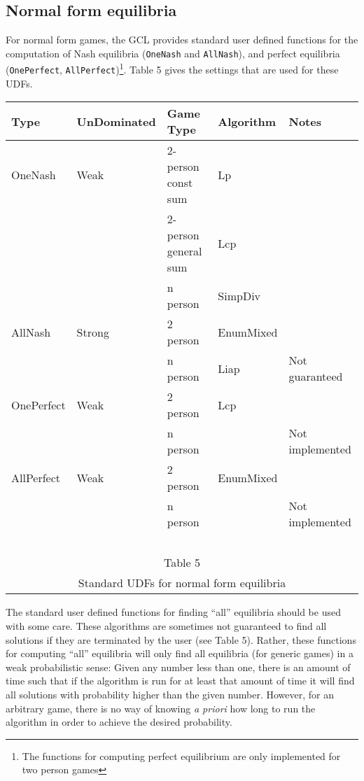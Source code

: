 \subsection{Normal form equilibria}

For normal form games, the GCL provides standard user defined
functions for the computation of Nash equilibria (\texttt{OneNash} and \texttt{AllNash}), and perfect
equilibria (\texttt{OnePerfect}, \texttt{AllPerfect})\footnote{The
functions for computing perfect equilibrium are only implemented for
two person games}.  Table 5 gives the settings that are used for these
UDFs.

\medskip
\begin{center}
\begin{tabular}{|l|l|p{2cm}|l|l|}
\hline
Type & UnDominated & Game Type & Algorithm & Notes \\
\hline
OneNash & Weak & 2-person const sum & Lp & \\ \cline{3-5}
        &      & 2-person general  sum & Lcp& \\ \cline{3-5}
        &      & n person              & SimpDiv & \\
\hline
AllNash & Strong & 2 person       & EnumMixed & \\ \cline{3-5}
        &        & n person       & Liap      & Not guaranteed\\
\hline
\hline
OnePerfect & Weak & 2 person     & Lcp    & \\ \cline{3-5}
           &        & n person     &     &Not implemented  \\
\hline
AllPerfect & Weak & 2 person      & EnumMixed & \\ \cline{3-5}
           &        & n person      &     & Not implemented\\
\hline
\multicolumn{5}{c}{\ }\\
\multicolumn{5}{c}{Table 5}\\
\multicolumn{5}{c}{Standard UDFs for normal form equilibria}\\
\end{tabular}
\end{center}
\medskip

The standard user defined functions for finding ``all'' equilibria
should be used with some care.  These algorithms are sometimes not
guaranteed to find all solutions if they are terminated by the user
(see Table 5).  Rather, these functions for computing ``all''
equilibria will only find all equilibria (for generic games) in a weak
probabilistic sense: Given any number less than one, there is an
amount of time such that if the algorithm is run for at least that amount of
time it will find all solutions with probability higher than the given
number.  However, for an arbitrary game, there is no way of knowing
{\it a priori} how long to run the algorithm in order to achieve the
desired probability.  

